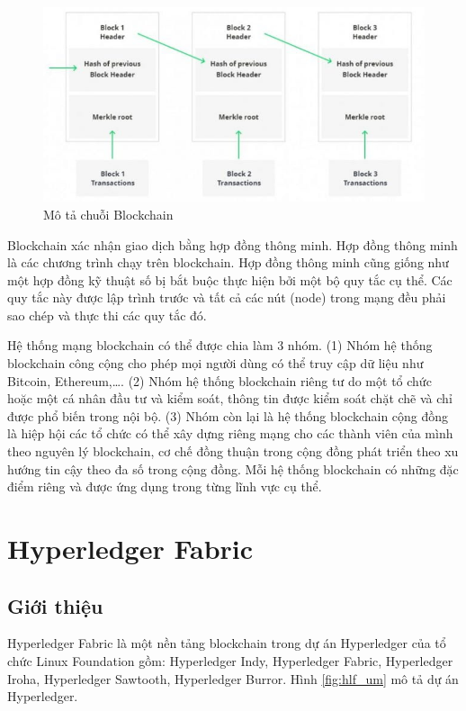 \begin{figure}[htbp]
\centering
\includegraphics[width=.9\linewidth]{img/blockchain.png}
\caption{Mô tả chuỗi Blockchain}
\label{fig:blockchain}
\end{figure}

Blockchain xác nhận giao dịch bằng hợp đồng thông minh. Hợp đồng thông minh là các chương trình chạy trên blockchain. Hợp đồng thông minh cũng giống như một hợp đồng kỹ thuật số bị bắt buộc thực hiện bởi một bộ quy tắc cụ thể. Các quy tắc này được lập trình trước và tất cả các nút (node) trong mạng đều phải sao chép và thực thi các quy tắc đó.

Hệ thống mạng blockchain có thể được chia làm 3 nhóm. (1) Nhóm hệ thống blockchain công cộng cho phép mọi người dùng có thể truy cập dữ liệu như Bitcoin, Ethereum,\ldots{}. (2) Nhóm hệ thống blockchain riêng tư do một tổ chức hoặc một cá nhân đầu tư và kiểm soát, thông tin được kiểm soát chặt chẽ và chỉ được phổ biến trong nội bộ. (3) Nhóm còn lại là hệ thống blockchain cộng đồng là hiệp hội các tổ chức có thể xây dựng riêng mạng cho các thành viên của mình theo nguyên lý blockchain, cơ chế đồng thuận trong cộng đồng phát triển theo xu hướng tin cậy theo đa số trong cộng đồng. Mỗi hệ thống blockchain có những đặc điểm riêng và được ứng dụng trong từng lĩnh vực cụ thể.

\section{Hyperledger Fabric}

\subsection{Giới thiệu}

Hyperledger Fabric là một nền tảng blockchain trong dự án Hyperledger của tổ chức Linux Foundation gồm: Hyperledger Indy, Hyperledger Fabric, Hyperledger Iroha, Hyperledger Sawtooth, Hyperledger Burror. Hình \ref{fig:hlf_um} mô tả dự án Hyperledger.

